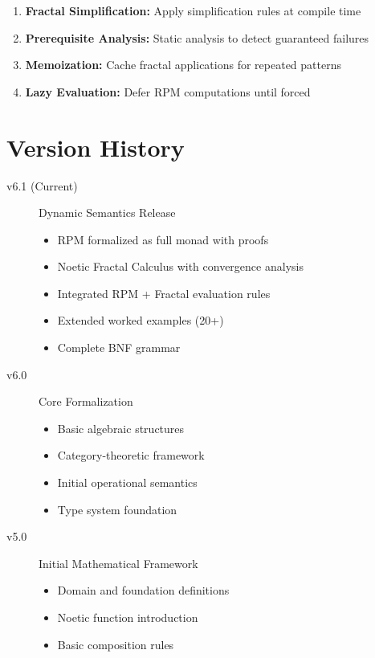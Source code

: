 \documentclass[11pt,twoside,openright]{book}
\theoremstyle{definition}
\theoremstyle{plain}
\theoremstyle{remark}
\begin{document}
\begin{enumerate}
\item \textbf{Fractal Simplification:} Apply simplification rules at compile time
\item \textbf{Prerequisite Analysis:} Static analysis to detect guaranteed failures
\item \textbf{Memoization:} Cache fractal applications for repeated patterns
\item \textbf{Lazy Evaluation:} Defer RPM computations until forced
\end{enumerate}

\chapter{Version History}
\label{app:versions}

\begin{description}
\item[v6.1 (Current)] Dynamic Semantics Release
  \begin{itemize}
  \item RPM formalized as full monad with proofs
  \item Noetic Fractal Calculus with convergence analysis
  \item Integrated RPM + Fractal evaluation rules
  \item Extended worked examples (20+)
  \item Complete BNF grammar
  \end{itemize}

\item[v6.0] Core Formalization
  \begin{itemize}
  \item Basic algebraic structures
  \item Category-theoretic framework
  \item Initial operational semantics
  \item Type system foundation
  \end{itemize}

\item[v5.0] Initial Mathematical Framework
  \begin{itemize}
  \item Domain and foundation definitions
  \item Noetic function introduction
  \item Basic composition rules
  \end{itemize}
\end{description}
\end{document}
